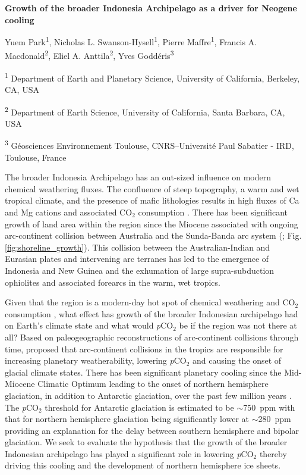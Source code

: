 \documentclass[11pt,letterpaper]{article}
\newcommand{\pCOtwo}{\textit{p}CO$_{2}$\xspace}
\newcommand{\COtwo}{CO$_{2}$\xspace}
\begin{document}
\begin{flushleft}
{\Large \textbf{Growth of the broader Indonesia Archipelago as a driver for Neogene cooling}}

Yuem Park\textsuperscript{1},
Nicholas L. Swanson-Hysell\textsuperscript{1},
Pierre Maffre\textsuperscript{1},
Francis A. Macdonald\textsuperscript{2},
Eliel A. Anttila\textsuperscript{2},
Yves Godd\'eris\textsuperscript{3}

\bigskip
\textsuperscript{1} Department of Earth and Planetary Science, University of California, Berkeley, CA, USA

\textsuperscript{2} Department of Earth Science, University of California, Santa Barbara, CA, USA

\textsuperscript{3} G\'eosciences Environnement Toulouse, CNRS--Universit\'e Paul Sabatier - IRD, Toulouse, France

\bigskip

\end{flushleft}

\linenumbers

The broader Indonesia Archipelago has an out-sized influence on modern chemical weathering fluxes. The confluence of steep topography, a warm and wet tropical climate, and the presence of mafic lithologies results in high fluxes of Ca and Mg cations and associated \COtwo consumption \citep{Hartmann2009a, Hartmann2014a}. There has been significant growth of land area within the region since the Miocene associated with ongoing arc-continent collision between Australia and the Sunda-Banda arc system (\citealp{Molnar2015a}; Fig. \ref{fig:shoreline_growth}). This collision between the Australian-Indian and Eurasian plates and intervening arc terranes has led to the emergence of Indonesia and New Guinea and the exhumation of large supra-subduction ophiolites and associated forearcs in the warm, wet tropics.

Given that the region is a modern-day hot spot of chemical weathering and \COtwo consumption \citep{Hartmann2009a}, what effect has growth of the broader Indonesian archipelago had on Earth's climate state and what would \pCOtwo be if the region was not there at all? Based on paleogeographic reconstructions of arc-continent collisions through time, \citet{Macdonald2019a} proposed that arc-continent collisions in the tropics are responsible for increasing planetary weatherability, lowering \pCOtwo and causing the onset of glacial climate states. There has been significant planetary cooling since the Mid-Miocene Climatic Optimum leading to the onset of northern hemisphere glaciation, in addition to Antarctic glaciation, over the past few million years \citep{Shackleton1984a}. The \pCOtwo threshold for Antarctic glaciation is estimated to be $\sim$750~ppm with that for northern hemisphere glaciation being significantly lower at $\sim$280~ppm \citep{DeConto2008a} providing an explanation for the delay between southern hemisphere and bipolar glaciation. We seek to evaluate the hypothesis that the growth of the broader Indonesian archipelago has played a significant role in lowering \pCOtwo thereby driving this cooling and the development of northern hemisphere ice sheets.
\end{document}
